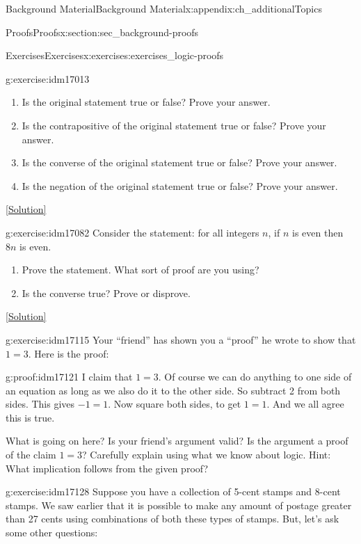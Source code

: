 \documentclass[oneside,10pt,]{book}
\numberwithin{equation}{chapter}
\begin{document}
\begin{appendixptx}{Background Material}{}{Background Material}{}{}{x:appendix:ch_additionalTopics}
\begin{sectionptx}{Proofs}{}{Proofs}{}{}{x:section:sec_background-proofs}
\begin{exercises-subsection}{Exercises}{}{Exercises}{}{}{x:exercises:exercises_logic-proofs}
\begin{divisionexercise}{1}{}{}{g:exercise:idm17013}
\begin{enumerate}[label=(\alph*)]
\item{}Is the original statement true or false? Prove your answer.%
\item{}Is the contrapositive of the original statement true or false? Prove your answer.%
\item{}Is the converse of the original statement true or false? Prove your answer.%
\item{}Is the negation of the original statement true or false? Prove your answer.%
\end{enumerate}
%
\space\hspace*{0pt}\hfill{\tiny\hyperlink{g:solution:idm17038-main}{[Solution]}}\end{divisionexercise}%
\begin{divisionexercise}{2}{}{}{g:exercise:idm17082}%
Consider the statement: for all integers \(n\), if \(n\) is even then \(8n\) is even.%
\par
%
\begin{enumerate}[label=(\alph*)]
\item{}Prove the statement. What sort of proof are you using?%
\item{}Is the converse true? Prove or disprove.%
\end{enumerate}
%
\space\hspace*{0pt}\hfill{\tiny\hyperlink{g:solution:idm17094-main}{[Solution]}}\end{divisionexercise}%
\begin{divisionexercise}{3}{}{}{g:exercise:idm17115}%
Your ``friend'' has shown you a ``proof'' he wrote to show that \(1 = 3\). Here is the proof:%
\begin{proofptx}{}{g:proof:idm17121}
I claim that \(1 = 3\). Of course we can do anything to one side of an equation as long as we also do it to the other side. So subtract 2 from both sides. This gives \(-1 = 1\). Now square both sides, to get \(1 = 1\). And we all agree this is true.%
\end{proofptx}
What is going on here? Is your friend's argument valid? Is the argument a proof of the claim \(1=3\)? Carefully explain using what we know about logic. Hint: What implication follows from the given proof?%
\end{divisionexercise}%
\begin{divisionexercise}{4}{}{}{g:exercise:idm17128}%
Suppose you have a collection of 5-cent stamps and 8-cent stamps. We saw earlier that it is possible to make any amount of postage greater than 27 cents using combinations of both these types of stamps. But, let's ask some other questions:%

\end{divisionexercise}
\end{exercises-subsection}
\end{sectionptx}
\end{appendixptx}
\end{document}
